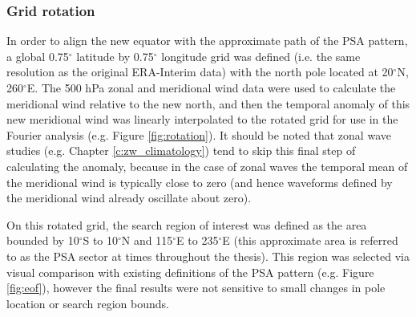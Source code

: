 \subsubsection{Grid rotation}

In order to align the new equator with the approximate path of the PSA pattern, a global 0.75$^{\circ}$ latitude by 0.75$^{\circ}$ longitude grid was defined (i.e. the same resolution as the original ERA-Interim data) with the north pole located at 20$^{\circ}$N, 260$^{\circ}$E. The 500 hPa zonal and meridional wind data were used to calculate the meridional wind relative to the new north, and then the temporal anomaly of this new meridional wind was linearly interpolated to the rotated grid for use in the Fourier analysis (e.g. Figure \ref{fig:rotation}). It should be noted that zonal wave studies (e.g. Chapter \ref{c:zw_climatology}) tend to skip this final step of calculating the anomaly, because in the case of zonal waves the temporal mean of the meridional wind is typically close to zero (and hence waveforms defined by the meridional wind already oscillate about zero). 

On this rotated grid, the search region of interest was defined as the area bounded by 10$^{\circ}$S to 10$^{\circ}$N and 115$^{\circ}$E to 235$^{\circ}$E (this approximate area is referred to as the PSA sector at times throughout the thesis). This region was selected via visual comparison with existing definitions of the PSA pattern (e.g. Figure \ref{fig:eof}), however the final results were not sensitive to small changes in pole location or search region bounds.

